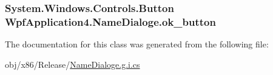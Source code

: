 \hypertarget{classWpfApplication4_1_1NameDialoge_a66734ab0766d633159da4b222fb5914d}{
\subsubsection[{ok\-\_\-button}]{\setlength{\rightskip}{0pt plus 5cm}System.\-Windows.\-Controls.\-Button Wpf\-Application4.\-Name\-Dialoge.\-ok\-\_\-button\hspace{0.3cm}{\ttfamily [package]}}}\label{classWpfApplication4_1_1NameDialoge_a66734ab0766d633159da4b222fb5914d}


The documentation for this class was generated from the following file\-:\begin{DoxyCompactItemize}
\item 
obj/x86/\-Release/\hyperlink{NameDialoge_8g_8i_8cs}{Name\-Dialoge.\-g.\-i.\-cs}\end{DoxyCompactItemize}
